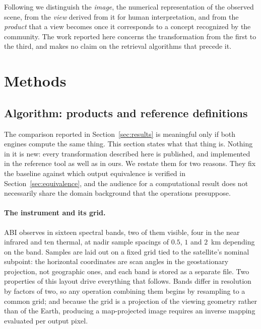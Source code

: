 \documentclass[11pt]{article}
\begin{document}
Following \citet{LiraChavez2010} we distinguish the \emph{image}, the numerical
representation of the observed scene, from the \emph{view} derived from it for
human interpretation, and from the \emph{product} that a view becomes once it
corresponds to a concept recognized by the community. The work reported here
concerns the transformation from the first to the third, and makes no claim on
the retrieval algorithms that precede it.

\section{Methods}
\label{sec:methods}

\subsection{Algorithm: products and reference definitions}
\label{sec:algorithms}

The comparison reported in Section~\ref{sec:results} is meaningful only if both
engines compute the same thing. This section states what that thing is. Nothing
in it is new: every transformation described here is published, and implemented
in the reference tool as well as in ours. We restate them for two reasons. They
fix the baseline against which output equivalence is verified in
Section~\ref{sec:equivalence}, and the audience for a computational result does
not necessarily share the domain background that the operations presuppose.

\paragraph{The instrument and its grid.}
ABI observes in sixteen spectral bands, two of them visible, four in the near
infrared and ten thermal, at nadir sample spacings of $0.5$, $1$ and $2$~km
depending on the band. Samples are laid out on a fixed grid tied to the
satellite's nominal subpoint: the horizontal coordinates are scan angles in the
geostationary projection, not geographic ones, and each band is stored as a
separate file. Two properties of this layout drive everything that follows.
Bands differ in resolution by factors of two, so any operation combining them
begins by resampling to a common grid; and because the grid is a projection of
the viewing geometry rather than of the Earth, producing a map-projected image
requires an inverse mapping evaluated per output pixel.
\end{document}
